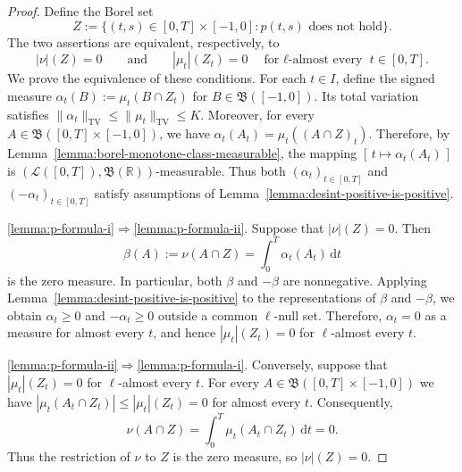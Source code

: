 \documentclass[reqno]{amsart}
\theoremstyle{plain}
\numberwithin{equation}{section}
\numberwithin{definition}{section}
\newcommand\RR{\ensuremath{\mathbb{R}}}
\newcommand{\dd}{\ensuremath{\mathrm{d}}}
\begin{document}
\begin{proof}
Define the Borel set
\begin{equation*}
        Z:=\{(t,s)\in [0,T]\times[-1,0]: p(t,s)
         \text{ does not hold}\}.
\end{equation*}
The two assertions are equivalent, respectively, to
\begin{equation*}
    |\nu|(Z)=0
    \qquad\text{and}\qquad
    |\mu_t|(Z_t)=0
    \quad\text{for $\ell$-almost every }t\in [0,T].
\end{equation*}
We prove the equivalence of these conditions. For each $t\in I$, define the signed measure $\alpha_t(B):=\mu_t(B\cap Z_t)$ for $B\in\mathfrak B([-1,0])$. 
Its total variation satisfies $\|\alpha_t\|_{\mathrm{TV}}
\leq\|\mu_t\|_{\mathrm{TV}}\leq K$. 
Moreover, for every $A\in\mathfrak B([0,T]\times [-1,0])$, we have $\alpha_t(A_t)=\mu_t((A\cap Z)_t)$. 
Therefore, by Lemma~\ref{lemma:borel-monotone-class-measurable}, the mapping $[ \, t \mapsto \alpha_t(A_t)\, ]$ is $(\mathcal L([0,T]),\mathfrak B(\RR))$-measurable. Thus both $(\alpha_t)_{t\in [0,T]}$
and $(-\alpha_t)_{t\in [0,T]}$ satisfy
assumptions of Lemma~\ref{lemma:desint-positive-is-positive}.

\ref{lemma:p-formula-i}$\Rightarrow$\ref{lemma:p-formula-ii}.  Suppose that $|\nu|(Z)=0$. Then
\begin{equation*}
        \beta(A):=\nu(A\cap Z)
             =\int_0^T\alpha_t(A_t)\,\dd t
\end{equation*}
is the zero measure. In particular, both $\beta$
and $-\beta$ are nonnegative.
Applying Lemma~\ref{lemma:desint-positive-is-positive} to the representations of
$\beta$ and $-\beta$, we obtain $\alpha_t\geq0 $ and $-\alpha_t\geq0$ 
outside a common $\ell$-null set.
Therefore, $\alpha_t=0$ as a measure for almost
every $t$, and hence $ |\mu_t|(Z_t)=0$
for $\ell$-almost every $t$. 

\ref{lemma:p-formula-ii}$\Rightarrow$\ref{lemma:p-formula-i}. Conversely, suppose that $|\mu_t|(Z_t)=0$
for $\ell$-almost every $t$.
For every $A\in\mathfrak B([0,T]\times [-1,0])$ we have $   |\mu_t(A_t\cap Z_t)|
    \leq|\mu_t|(Z_t)=0$ 
for almost every $t$. Consequently,
\begin{equation*}
        \nu(A\cap Z)
    =\int_{0}^T\mu_t(A_t\cap Z_t)\,\dd t
    =0.
\end{equation*}
Thus the restriction of $\nu$ to $Z$ is the zero
measure, so $|\nu|(Z)=0$. 
\end{proof}
\end{document}
